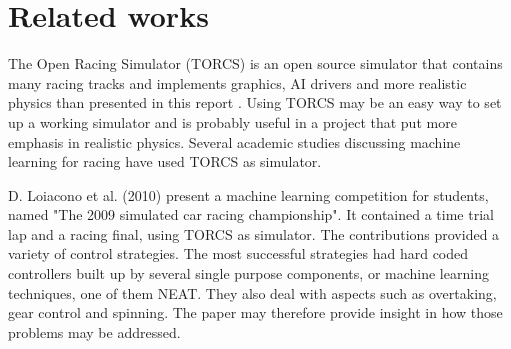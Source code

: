 





\section{Related works}

The Open Racing Simulator (TORCS) is an open source simulator that contains many racing tracks and implements graphics, AI drivers and more realistic physics than presented in this report \cite{torcs}. Using TORCS may be an easy way to set up a working simulator and is probably useful in a project that put more emphasis in realistic physics. Several academic studies discussing machine learning for racing have used TORCS as simulator. 

D. Loiacono et al. (2010) present a machine learning competition for students, named "The 2009 simulated car racing championship". It contained a time trial lap and a racing final, using TORCS as simulator. The contributions provided a variety of control strategies. The most successful strategies had hard coded controllers built up by several single purpose components, or machine learning techniques, one of them NEAT. They also deal with aspects such as overtaking, gear control and spinning. The paper may therefore provide insight in how those problems may be addressed.

